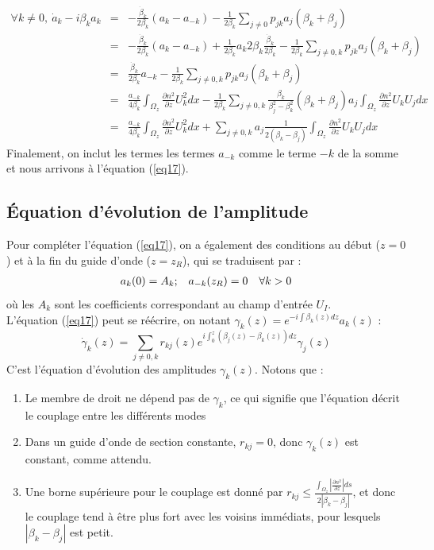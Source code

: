 \documentclass{article}
\begin{document}
\begin{eqnarray*}
\forall k\neq 0,\ \dot{a}_k-i\beta_ka_k&=&-\frac{\dot{\beta}_k}{2\beta_k}(a_k-a_{-k})-\frac{1}{2\beta_k}\sum_{j\neq 0}p_{jk}a_j(\beta_k+\beta_j)\\
		&=&-\frac{\dot{\beta}_k}{2\beta_k}(a_k-a_{-k})+\frac{1}{2\beta_k}a_k2\beta_k\frac{\dot{\beta}_k}{2\beta_k}-\frac{1}{2\beta_k}\sum_{j\neq 0,k}p_{jk}a_j(\beta_k+\beta_j)\\
		&=&\frac{\dot{\beta}_k}{2\beta_k}a_{-k}-\frac{1}{2\beta_k}\sum_{j\neq 0,k}p_{jk}a_j(\beta_k+\beta_j)\\
		&=&\frac{a_{-k}}{4\beta_k}\int_{\Omega_z}\frac{\partial n^2}{\partial z}U_k^2dx-\frac{1}{2\beta_k}\sum_{j\neq 0,k}\frac{\beta_k}{\beta_j^2-\beta_k^2}(\beta_k+\beta_j)a_j\int_{\Omega_z}\frac{\partial n^2}{\partial z}U_kU_jdx\\
		&=&\frac{a_{-k}}{4\beta_k}\int_{\Omega_z}\frac{\partial n^2}{\partial z}U_k^2dx + \sum_{j\neq 0,k} a_j\frac{1}{2(\beta_k-\beta_j)}\int_{\Omega_z}\frac{\partial n^2}{\partial z}U_kU_jdx\ 
\end{eqnarray*}
Finalement, on inclut les termes les termes $a_{-k}$ comme le terme $-k$ de la somme et nous arrivons à l'équation (\ref{eq17}).

\subsection{Équation d'évolution de l'amplitude}
Pour compléter l'équation (\ref{eq17}), on a également des conditions au début ($z=0$) et à la fin du guide d'onde ($z=z_R$), qui se traduisent par :
\begin{equation}\label{eq18}
\begin{array}{c c c}
	a_k(0)=A_k; & a_{-k}(z_R)=0 & \forall k>0
\end{array}
\end{equation}
où les $A_k$ sont les coefficients correspondant au champ d'entrée $U_I$.\\
L'équation (\ref{eq17}) peut se réécrire, on notant $\gamma_k(z)=e^{-i\int \beta_k(z)dz}a_k(z)$ :
\begin{equation}\label{eq19}
	 \dot{\gamma}_k(z)=\sum_{j\neq 0,k} r_{kj}(z)e^{i\int_0^z (\beta_j(z)-\beta_k(z))dz}\gamma_j(z)
\end{equation}
C'est l'équation d'évolution des amplitudes $\gamma_k(z)$. Notons que :
\begin{enumerate}
\item Le membre de droit ne dépend pas de $\gamma_k$, ce qui signifie que l'équation décrit le couplage entre les différents modes
\item Dans un guide d'onde de section constante, $r_{kj}=0$, donc $\gamma_k(z)$ est constant, comme attendu.
\item Une borne supérieure pour le couplage est donné par $r_{kj}\leq \frac{\int_{\Omega_z} \left|\frac{\partial n^2}{\partial z}\right|ds}{2|\beta_k-\beta_j|}$, et donc le couplage tend à être plus fort avec les voisins immédiats, pour lesquels $|\beta_k-\beta_j|$ est petit.
\end{enumerate}
\end{document}

